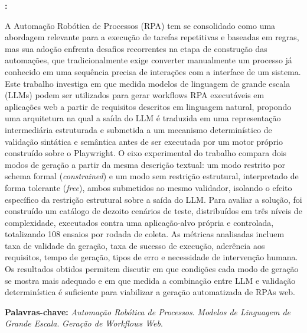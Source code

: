 \documentclass[
	article,
	12pt,
	oneside,
	a4paper,
	section=TITLE,
	english,
	brazil,
	sumario=tradicional
	]{abntex2}
\providecommand{\imprimirsubtitulo}{}
\renewcommand{\maketitle}{%
	\thispagestyle{icevpretextual}
	\begin{center}
		{\fontsize{18}{21.6}\selectfont\bfseries\MakeUppercase{\imprimirtitulo}\par}
		{\fontsize{18}{21.6}\selectfont\imprimirsubtitulo\par}
	\end{center}
	\vspace{2cm}
	\begin{flushright}
		\fontsize{14}{16.8}\selectfont\imprimirautor
	\end{flushright}
	\vspace{2.5cm}
}
\renewenvironment{resumoumacoluna}[1][\resumoname]{%
	\PRIVATEbookmarkthis{#1}%
	\parindent0pt\relax
	\noindent\textbf{#1:}\par
	\vspace{12pt}
}{%
	\par
	\PRIVATEclearpageifneeded
}
\begin{document}
\frenchspacing
\pagestyle{icevpretextual}

\maketitle

\begin{resumoumacoluna}
A Automação Robótica de Processos (RPA) tem se consolidado como uma
abordagem relevante para a execução de tarefas repetitivas e baseadas em
regras, mas sua adoção enfrenta desafios recorrentes na etapa de
construção das automações, que tradicionalmente exige converter
manualmente um processo já conhecido em uma sequência precisa de
interações com a interface de um sistema. Este trabalho investiga em que
medida modelos de linguagem de grande escala (LLMs) podem ser utilizados
para gerar workflows RPA executáveis em aplicações web a partir de
requisitos descritos em linguagem natural, propondo uma arquitetura na
qual a saída do LLM é traduzida em uma representação intermediária
estruturada e submetida a um mecanismo determinístico de validação
sintática e semântica antes de ser executada por um motor próprio
construído sobre o Playwright. O eixo experimental do trabalho compara
dois modos de geração a partir da mesma descrição textual: um modo
restrito por schema formal (\textit{constrained}) e um modo sem restrição
estrutural, interpretado de forma tolerante (\textit{free}), ambos
submetidos ao mesmo validador, isolando o efeito específico da restrição
estrutural sobre a saída do LLM. Para avaliar a solução, foi construído um
catálogo de dezoito cenários de teste, distribuídos em três níveis de
complexidade, executados contra uma aplicação-alvo própria e controlada,
totalizando 108 ensaios por rodada de coleta. As métricas analisadas
incluem taxa de validade da geração, taxa de sucesso de execução,
aderência aos requisitos, tempo de geração, tipos de erro e necessidade de
intervenção humana. Os resultados obtidos permitem discutir em que
condições cada modo de geração se mostra mais adequado e em que medida a
combinação entre LLM e validação determinística é suficiente para
viabilizar a geração automatizada de RPAs web.

\vspace{\onelineskip}
\noindent
\textbf{Palavras-chave:} \textit{Automação Robótica de Processos}. \textit{Modelos de Linguagem de Grande Escala}. \textit{Geração de Workflows Web}.
\end{resumoumacoluna}
\end{document}
